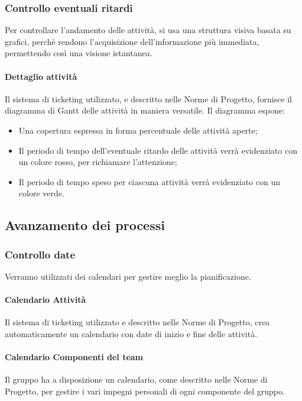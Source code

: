 \subsubsection{Controllo eventuali ritardi}
Per controllare l'andamento delle attività, si usa una struttura visiva basata su grafici, perchè rendono l'acquisizione dell'informazione più immediata, permettendo così una visione istantanea.
\paragraph{Dettaglio attività}
Il sistema di ticketing utilizzato, e descritto nelle Norme di Progetto, fornisce il diagramma di Gantt delle attività in maniera versatile. Il diagramma espone:
\begin{itemize}
\item Una copertura espressa in forma percentuale delle attività aperte;
\item Il periodo di tempo dell'eventuale ritardo delle attività verrà evidenziato con un colore rosso, per richiamare l'attenzione;
\item Il periodo di tempo speso per ciascuna attività verrà evidenziato con un colore verde.
\end{itemize}
\subsection{Avanzamento dei processi}
\subsubsection{Controllo date}
Verranno utilizzati dei calendari per gestire meglio la pianificazione.
\paragraph{Calendario Attività}
Il sistema di ticketing utilizzato e descritto nelle Norme di Progetto, crea automaticamente un calendario con date di inizio e fine delle attività.
\paragraph{Calendario Componenti del team}
Il gruppo ha a disposizione un calendario, come descritto nelle Norme di Progetto, per gestire i vari impegni personali di ogni componente del gruppo.
